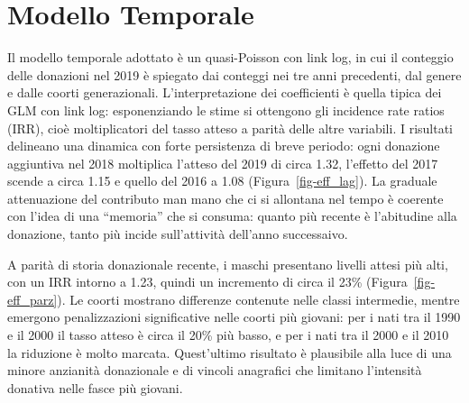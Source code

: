 \documentclass[
  italian,
  a4paper,
  a4paper,
  twoside,
  open=right,
  12pt]{scrbook}
\theoremstyle{definition}
\theoremstyle{remark}
\begin{document}
\begin{table}

\caption{\label{tbl-model_performance}Performance dei modelli}


\end{table}%

\section{Modello Temporale}\label{modello-temporale}

Il modello temporale adottato è un quasi-Poisson con link log, in cui il
conteggio delle donazioni nel 2019 è spiegato dai conteggi nei tre anni
precedenti, dal genere e dalle coorti generazionali. L'interpretazione
dei coefficienti è quella tipica dei GLM con link log: esponenziando le
stime si ottengono gli incidence rate ratios (IRR), cioè moltiplicatori
del tasso atteso a parità delle altre variabili. I risultati delineano
una dinamica con forte persistenza di breve periodo: ogni donazione
aggiuntiva nel 2018 moltiplica l'atteso del 2019 di circa 1.32,
l'effetto del 2017 scende a circa 1.15 e quello del 2016 a 1.08
(Figura~\ref{fig-eff_lag}). La graduale attenuazione del contributo man
mano che ci si allontana nel tempo è coerente con l'idea di una
``memoria'' che si consuma: quanto più recente è l'abitudine alla
donazione, tanto più incide sull'attività dell'anno successaivo.

A parità di storia donazionale recente, i maschi presentano livelli
attesi più alti, con un IRR intorno a 1.23, quindi un incremento di
circa il 23\% (Figura~\ref{fig-eff_parz}). Le coorti mostrano differenze
contenute nelle classi intermedie, mentre emergono penalizzazioni
significative nelle coorti più giovani: per i nati tra il 1990 e il 2000
il tasso atteso è circa il 20\% più basso, e per i nati tra il 2000 e il
2010 la riduzione è molto marcata. Quest'ultimo risultato è plausibile
alla luce di una minore anzianità donazionale e di vincoli anagrafici
che limitano l'intensità donativa nelle fasce più giovani.
\end{document}

